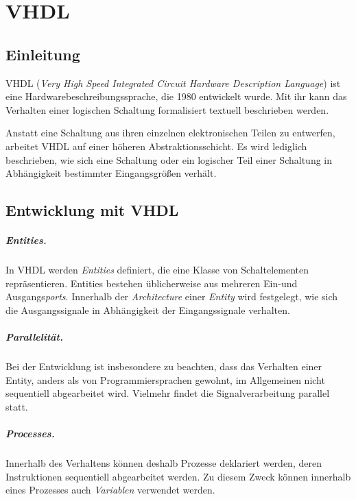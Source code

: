 \chapter{VHDL} %
\label{VHDL} %

\section{Einleitung}
VHDL (\textit{Very High Speed Integrated Circuit Hardware Description Language}) ist eine Hardwarebeschreibungssprache, die 1980 entwickelt wurde. Mit ihr kann das Verhalten einer logischen Schaltung formalisiert textuell beschrieben werden. 

Anstatt eine Schaltung aus ihren einzelnen elektronischen Teilen zu entwerfen, arbeitet VHDL auf einer höheren Abstraktionsschicht. Es wird lediglich beschrieben, wie sich eine Schaltung oder ein logischer Teil einer Schaltung in Abhängigkeit bestimmter Eingangsgrößen verhält.

\section{Entwicklung mit VHDL}
\paragraph{Entities.} In VHDL werden \textit{Entities} definiert, die eine Klasse von Schaltelementen repräsentieren. Entities bestehen üblicherweise aus mehreren Ein-und Ausgangs\textit{ports}. Innerhalb der \textit{Architecture} einer \textit{Entity} wird festgelegt, wie sich die Ausgangssignale in Abhängigkeit der Eingangssignale verhalten.

\paragraph{Parallelität.} Bei der Entwicklung ist insbesondere zu beachten, dass das Verhalten einer Entity, anders als von Programmiersprachen gewohnt, im Allgemeinen nicht sequentiell abgearbeitet wird. Vielmehr findet die Signalverarbeitung parallel statt.

\paragraph{Processes.} Innerhalb des Verhaltens können deshalb Prozesse deklariert werden, deren Instruktionen sequentiell abgearbeitet werden. Zu diesem Zweck können innerhalb eines Prozesses auch \textit{Variablen} verwendet werden.


